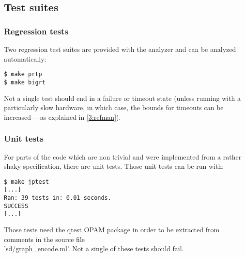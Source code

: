 \subsection{Test suites}

\subsubsection{Regression tests}

Two regression test suites are provided with the analyzer and can be
analyzed automatically:
\begin{verbatim}
$ make prtp
$ make bigrt
\end{verbatim}
Not a single test should end in a failure or timeout state (unless
running with a particularly slow hardware, in which case, the bounds
for timeouts can be increased ---as explained in \cref{3:refman}).

\subsubsection{Unit tests}

For parts of the code which are non trivial and were implemented
from a rather shaky specification, there are unit tests.
Those unit tests can be run with:
\begin{verbatim}
$ make jptest
[...]
Ran: 39 tests in: 0.01 seconds.                                                
SUCCESS
[...]
\end{verbatim}
Those tests need the qtest OPAM package
in order to be extracted from comments in the source file\\
'sd/graph\_encode.ml'.
Not a single of these tests should fail.
